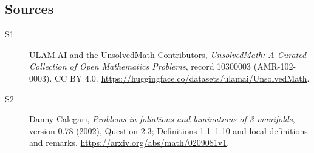 \documentclass[11pt]{article}
\begin{document}
\subsection{Sources}
\begin{description}
\item[\hypertarget{source:10300003:1}{S1}] ULAM.AI and the UnsolvedMath Contributors, \emph{UnsolvedMath: A Curated Collection of Open Mathematics Problems}, record 10300003 (AMR-102-0003). CC BY 4.0. \url{https://huggingface.co/datasets/ulamai/UnsolvedMath}.
\item[\hypertarget{source:10300003:2}{S2}] Danny Calegari, \emph{Problems in foliations and laminations of 3-manifolds}, version 0.78 (2002), Question 2.3; Definitions 1.1--1.10 and local definitions and remarks. \url{https://arxiv.org/abs/math/0209081v1}.
\end{description}
\label{end:10300003}
\end{document}
